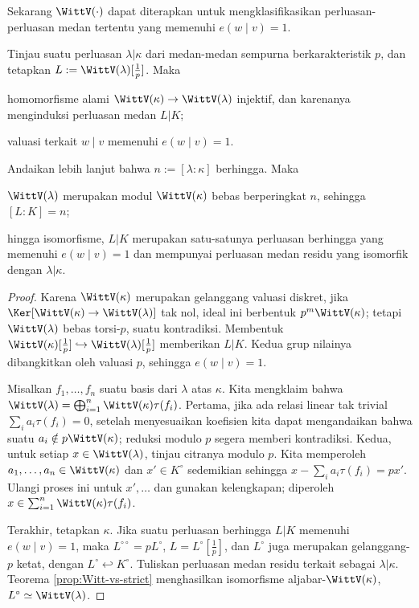 Sekarang $\WittV(\cdot)$ dapat diterapkan untuk mengklasifikasikan perluasan-perluasan medan tertentu yang memenuhi $e(w \mid v)=1$.
\begin{proposition}
	Tinjau suatu perluasan $\lambda | \kappa$ dari medan-medan sempurna berkarakteristik $p$, dan tetapkan $L := \WittV(\lambda)[\frac{1}{p}]$. Maka
	\begin{compactitem}
		\item homomorfisme alami $\WittV(\kappa) \to \WittV(\lambda)$ injektif, dan karenanya menginduksi perluasan medan $L|K$;
		\item valuasi terkait $w \mid v$ memenuhi $e(w \mid v) = 1$.
	\end{compactitem}
	Andaikan lebih lanjut bahwa $n := [\lambda: \kappa]$ berhingga. Maka
	\begin{compactitem}
		\item $\WittV(\lambda)$ merupakan modul $\WittV(\kappa)$ bebas berperingkat $n$, sehingga $[L:K]=n$;
		\item hingga isomorfisme, $L|K$ merupakan satu-satunya perluasan berhingga yang memenuhi $e(w \mid v)=1$ dan mempunyai perluasan medan residu yang isomorfik dengan $\lambda|\kappa$.
	\end{compactitem}
\end{proposition}
\begin{proof}
	Karena $\WittV(\kappa)$ merupakan gelanggang valuasi diskret, jika $\Ker[\WittV(\kappa) \to \WittV(\lambda)]$ tak nol, ideal ini berbentuk $p^m \WittV(\kappa)$; tetapi $\WittV(\lambda)$ bebas torsi-$p$, suatu kontradiksi. Membentuk $\WittV(\kappa)[\frac{1}{p}] \hookrightarrow \WittV(\lambda)[\frac{1}{p}]$ memberikan $L|K$. Kedua grup nilainya dibangkitkan oleh valuasi $p$, sehingga $e(w \mid v) = 1$.

	Misalkan $f_1, \ldots, f_n$ suatu basis dari $\lambda$ atas $\kappa$. Kita mengklaim bahwa $\WittV(\lambda) = \bigoplus_{i=1}^n \WittV(\kappa) \tau(f_i)$. Pertama, jika ada relasi linear tak trivial $\sum_i a_i \tau(f_i) = 0$, setelah menyesuaikan koefisien kita dapat mengandaikan bahwa suatu $a_i \notin p\WittV(\kappa)$; reduksi modulo $p$ segera memberi kontradiksi. Kedua, untuk setiap $x \in \WittV(\lambda)$, tinjau citranya modulo $p$. Kita memperoleh $a_1, \ldots, a_n \in \WittV(\kappa)$ dan $x' \in K^\circ$ sedemikian sehingga $x - \sum_i a_i \tau(f_i)  = px'$. Ulangi proses ini untuk $x', \ldots$ dan gunakan kelengkapan; diperoleh $x \in \sum_{i=1}^n \WittV(\kappa) \tau(f_i)$.

	Terakhir, tetapkan $\kappa$. Jika suatu perluasan berhingga $L|K$ memenuhi $e(w \mid v)=1$, maka $L^{\circ\circ} = pL^\circ$, $L = L^\circ[\frac{1}{p}]$, dan $L^\circ$ juga merupakan gelanggang-$p$ ketat, dengan $L^\circ \hookleftarrow K^\circ$. Tuliskan perluasan medan residu terkait sebagai $\lambda|\kappa$. Teorema \ref{prop:Witt-vs-strict} menghasilkan isomorfisme aljabar-$\WittV(\kappa)$, $L^\circ \simeq \WittV(\lambda)$.
\end{proof}


